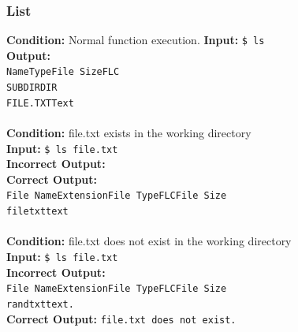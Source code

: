 \documentclass[12pt, letterpaper]{article}
\begin{document}
\subsubsection{List}
\textbf{Condition:} Normal function execution.
\textbf{Input:} \texttt{\$ ls}\\
\textbf{Output:}\\
\texttt{Name\qquad \qquad \quad Type\qquad File Size\qquad FLC\\
SUBDIR\qquad \qquad DIR \qquad \qquad {}\\
FILE.TXT\qquad \quad Text    \qquad {}}\\\\
\textbf{Condition:}  file.txt exists in the working directory\\
\textbf{Input:} \texttt{\$ ls file.txt}\\
\textbf{Incorrect Output:} \texttt{}\\
\textbf{Correct Output:}\\ 
\texttt{File Name\quad Extension\quad File Type\quad FLC\quad File Size \\file\qquad \qquad    txt\qquad \qquad text\qquad {}\qquad {}}\\
\\
\textbf{Condition:} file.txt does not exist in the working directory \\
\textbf{Input:} \texttt{\$ ls file.txt }\\
\textbf{Incorrect Output:}\\ 
\texttt{File Name\quad Extension\quad File Type\quad FLC\quad File Size \\rand\qquad \qquad    txt\qquad \qquad text\qquad {}\qquad {}.}\\
\textbf{Correct Output:} \texttt{file.txt does not exist.}\\
\end{document}
